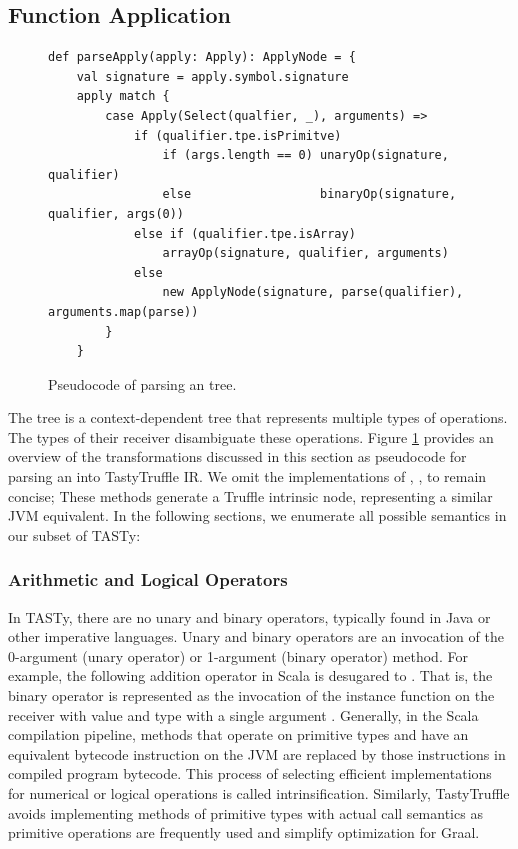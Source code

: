 \subsection{Function Application}
\label{impl:subsection:apply}

\begin{figure}[!htb]
\begin{verbatim}
def parseApply(apply: Apply): ApplyNode = {
	val signature = apply.symbol.signature
	apply match {
		case Apply(Select(qualfier, _), arguments) => 
			if (qualifier.tpe.isPrimitve)
				if (args.length == 0) unaryOp(signature, qualifier)
				else                  binaryOp(signature, qualifier, args(0))
			else if (qualifier.tpe.isArray)
				arrayOp(signature, qualifier, arguments)
			else 
				new ApplyNode(signature, parse(qualifier), arguments.map(parse))	
		}
	}
\end{verbatim}
\caption{Pseudocode of parsing an  tree.}
\label{impl:parse-apply}
\end{figure}
The  tree is a context-dependent tree that represents multiple types of operations.
The types of their receiver disambiguate these operations.
Figure \ref{impl:parse-apply} provides an overview of the transformations discussed in this section as pseudocode for parsing an  into TastyTruffle IR.
We omit the implementations of , ,  to remain concise; 
These methods generate a Truffle intrinsic node, representing a similar JVM equivalent.
In the following sections, we enumerate all possible semantics in our subset of TASTy:

\subsubsection{Arithmetic and Logical Operators}

In TASTy, there are no unary and binary operators, typically found in Java or other imperative languages.
Unary and binary operators are an invocation of the 0-argument (unary operator) or 1-argument (binary operator) method. 
For example, the following addition operator in Scala  is desugared to . 
That is, the binary operator \scalainline{+} is represented as the invocation of the instance function  on the receiver with value  and type  with a single argument .
Generally, in the Scala compilation pipeline, methods that operate on primitive types and have an equivalent bytecode instruction on the JVM\cite{java:vm-spec} are replaced by those instructions in compiled program bytecode. 
This process of selecting efficient implementations for numerical or logical operations is called intrinsification.
Similarly, TastyTruffle avoids implementing methods of primitive types with actual call semantics as primitive operations are frequently used and simplify optimization for Graal.

